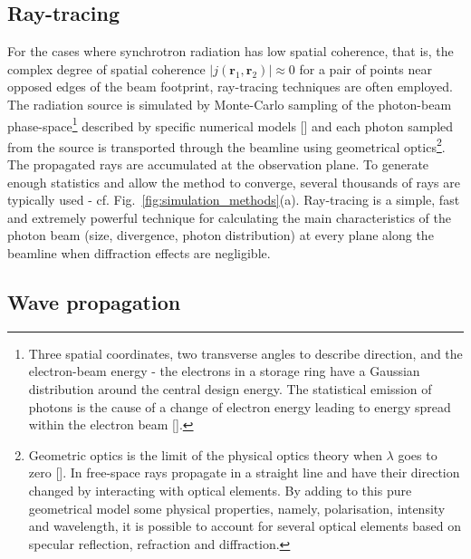 \begin{refsection}
\subsection{Ray-tracing}\label{sec:ray_tracing}
 For the cases where synchrotron radiation has low spatial coherence, that is, the complex degree of spatial coherence $|j(\textbf{r}_1,\textbf{r}_2)|\approx0$ for a pair of points near opposed edges of the beam footprint, ray-tracing techniques are often employed. The radiation source is simulated by Monte-Carlo sampling of the photon-beam phase-space\footnote{Three spatial coordinates, two transverse angles to describe direction, and the electron-beam energy - the electrons in a storage ring have a Gaussian distribution around the central design energy. The statistical emission of photons is the cause of a change of electron energy leading to energy spread within the electron beam [\cite[\textit{8.3.1}]{Wiedemann2015}].} described by specific numerical models [\cite{Canestrari2013}] and each photon sampled from the source is transported through the beamline using geometrical optics\footnote{Geometric optics is the limit of the physical optics theory when $\lambda$ goes to zero [\cite[\textit{§1.3.C} \& \textit{§2.3}]{Saleh2019}]. In free-space rays propagate in a straight line and have their direction changed by interacting with optical elements. By adding to this pure geometrical model some physical properties, namely, polarisation, intensity and wavelength, it is possible to account for several optical elements based on specular reflection, refraction and diffraction.}. The propagated rays are accumulated at the observation plane. To generate enough statistics and allow the method to converge, several thousands of rays are typically used - cf. Fig.~\ref{fig:simulation_methods}(a). Ray-tracing is a simple, fast and extremely powerful technique for calculating the main characteristics of the photon beam (size, divergence, photon distribution) at every plane along the beamline when diffraction effects are negligible.

\subsection{Wave propagation}\label{sec:wave_propag}


\end{refsection}
